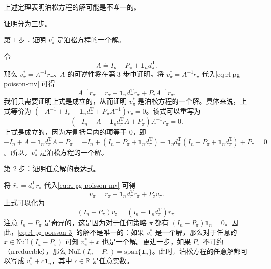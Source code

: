 上述定理表明泊松方程的解可能是不唯一的。

\begin{note}
\label{box:rl-pg-9-5}
证明分为三步。

第 1 步：证明 $v_{\pi}^{*}$ 是泊松方程的一个解。

令
\begin{equation}
A \doteq I_n - P_{\pi} + \mathbf{1}_n d_{\pi}^{\mathrm{T}}.
\end{equation}
那么 $v_{\pi}^{*} = A^{-1}r_{\pi}$。$A$ 的可逆性将在第 3 步中证明。将 $v_{\pi}^{*} = A^{-1}r_{\pi}$ 代入\cref{eq:rl-pg-poisson-mv} 可得
\begin{equation}
A^{-1} r_{\pi} = r_{\pi} - \mathbf{1}_n d_{\pi}^{\mathrm{T}} r_{\pi} + P_{\pi} A^{-1} r_{\pi}.
\end{equation}
我们只需要证明上式是成立的，从而证明 $v_{\pi}^{*}$ 是泊松方程的一个解。具体来说，上式等价为 $(-A^{-1} + I_n - \mathbf{1}_n d_\pi^{\mathrm{T}} + P_\pi A^{-1})r_\pi = 0$。该式可以重写为
\begin{equation}
(-I_n + A - \mathbf{1}_n d_{\pi}^{\mathrm{T}} A + P_{\pi}) A^{-1} r_{\pi} = 0.
\end{equation}
上式是成立的，因为左侧括号内的项等于 0，即 $-I_n + A - \mathbf{1}_n d_{\pi}^{\mathrm{T}}A + P_{\pi} = -I_n + (I_n - P_{\pi} + \mathbf{1}_n d_{\pi}^{\mathrm{T}}) - \mathbf{1}_n d_{\pi}^{\mathrm{T}}(I_n - P_{\pi} + \mathbf{1}_n d_{\pi}^{\mathrm{T}}) + P_{\pi} = 0$。所以，$v_{\pi}^{*}$ 是泊松方程的一个解。

第 2 步：证明任意解的表达式。

将 $\bar{r}_{\pi} = d_{\pi}^{\mathrm{T}}r_{\pi}$ 代入\cref{eq:rl-pg-poisson-mv} 可得
\begin{equation}
v_{\pi} = r_{\pi} - \mathbf{1}_n d_{\pi}^{\mathrm{T}} r_{\pi} + P_{\pi} v_{\pi}.
\label{eq:rl-pg-poisson-2}
\end{equation}
上式可以化为
\begin{equation}
(I_n - P_{\pi}) v_{\pi} = (I_n - \mathbf{1}_n d_{\pi}^{\mathrm{T}}) r_{\pi}.
\label{eq:rl-pg-poisson-3}
\end{equation}
注意 $I_n - P_{\pi}$ 是奇异的，这是因为对于任何策略 $\pi$ 都有 $(I_n - P_{\pi})\mathbf{1}_n = 0$。因此，\cref{eq:rl-pg-poisson-3} 的解不是唯一的：如果 $v_{\pi}^{*}$ 是一个解，那么对于任意的 $x\in \mathrm{Null}(I_n - P_\pi)$ 可知 $v_{\pi}^{*} + x$ 也是一个解。更进一步，如果 $P_{\pi}$ 不可约（irreducible），那么 $\mathrm{Null}(I_n - P_\pi) = \mathrm{span}\{\mathbf{1}_n\}$。此时，泊松方程的任意解都可以写成 $v_{\pi}^{*} + c\mathbf{1}_n$，其中 $c\in \mathbb{R}$ 是任意实数。


\end{note}
